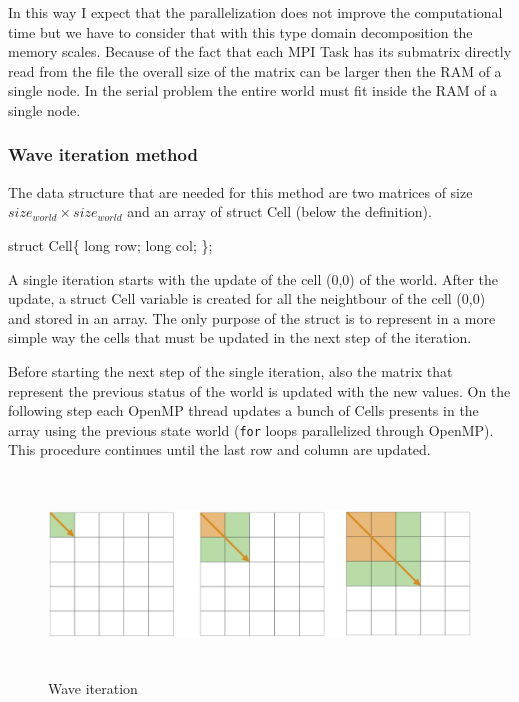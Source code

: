 \documentclass[
  letterpaper,
  DIV=11,
  numbers=noendperiod]{scrartcl}
\newenvironment{Shaded}{\begin{snugshade}}{\end{snugshade}}
\newcommand{\DataTypeTok}[1]{\textcolor[rgb]{0.68,0.00,0.00}{#1}}
\newcommand{\KeywordTok}[1]{\textcolor[rgb]{0.00,0.23,0.31}{#1}}
\newcommand{\NormalTok}[1]{\textcolor[rgb]{0.00,0.23,0.31}{#1}}
\newcommand{\OperatorTok}[1]{\textcolor[rgb]{0.37,0.37,0.37}{#1}}
\begin{document}
In this way I expect that the parallelization does not improve the
computational time but we have to consider that with this type domain
decomposition the memory scales. Because of the fact that each MPI Task
has its submatrix directly read from the file the overall size of the
matrix can be larger then the RAM of a single node. In the serial
problem the entire world must fit inside the RAM of a single node.

\hypertarget{wave-iteration-method}{%
\subsubsection{Wave iteration method}\label{wave-iteration-method}}

The data structure that are needed for this method are two matrices of
size \(size_{world} \times size_{world}\) and an array of struct Cell
(below the definition).

\begin{Shaded}
\begin{Highlighting}[]
\KeywordTok{struct}\NormalTok{ Cell}\OperatorTok{\{}
  \DataTypeTok{long}\NormalTok{ row}\OperatorTok{;}
  \DataTypeTok{long}\NormalTok{ col}\OperatorTok{;}
\OperatorTok{\};}
\end{Highlighting}
\end{Shaded}

A single iteration starts with the update of the cell (0,0) of the
world. After the update, a struct Cell variable is created for all the
neightbour of the cell (0,0) and stored in an array. The only purpose of
the struct is to represent in a more simple way the cells that must be
updated in the next step of the iteration.

Before starting the next step of the single iteration, also the matrix
that represent the previous status of the world is updated with the new
values. On the following step each OpenMP thread updates a bunch of
Cells presents in the array using the previous state world (\texttt{for}
loops parallelized through OpenMP). This procedure continues until the
last row and column are updated.

\begin{figure}

{\centering \includegraphics[width=\textwidth,height=2.08333in]{img/wave_update.png}

}

\caption{Wave iteration}

\end{figure}
\end{document}
